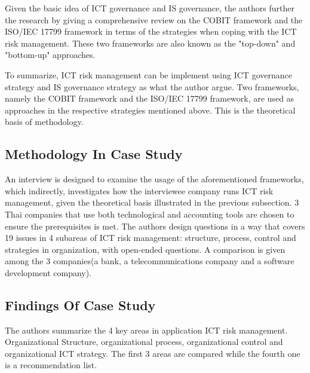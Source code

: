 Given the basic idea of ICT governance and IS governance, the authors further the research by giving a comprehensive review on the COBIT framework and the ISO/IEC 17799 framework in terms of the strategies when coping with the ICT risk management. These two frameworks are also known as the "top-down" and "bottom-up" approaches.

To summarize, ICT risk management can be implement using ICT governance strategy and IS governance strategy as what the author argue. Two frameworks, namely the COBIT framework and the ISO/IEC 17799 framework, are used as approaches in the respective strategies mentioned above. This is the theoretical basis of methodology.

\subsection{Methodology In Case Study}

An interview is designed to examine the usage of the aforementioned frameworks, which indirectly, investigates how the interviewee company runs ICT risk management, given the theoretical basis illustrated in the previous subsection. 3 Thai companies that use both technological and accounting tools are chosen to ensure the prerequisites is met. The authors design questions in a way that covers 19 issues in 4 subareas of ICT risk management: structure, process, control and strategies in organization, with open-ended questions. A comparison is given among the 3 companies(a bank, a telecommunications company and a software development company).

\subsection{Findings Of Case Study}

The authors summarize the 4 key areas in application ICT risk management. Organizational Structure, organizational process, organizational control and organizational ICT strategy. The first 3 areas are compared while the fourth one is a recommendation list.

